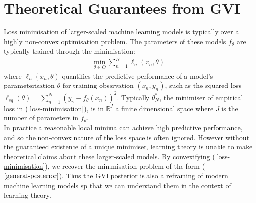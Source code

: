 \documentclass[twoside,11pt]{article}
\newcommand{\jk}[1]{{\color{blue} [JK: #1]}}
\begin{document}
\section{Theoretical Guarantees from GVI \cite{wild2023rigorous}}
Loss minimisation of larger-scaled machine learning models is typically over a highly non-convex optimisation problem. The parameters of these models $f_{\theta}$ are typically trained through the minimisation:
\begin{align}
\min_{\theta \in \Theta} \sum_{n=1}^N\ell_n(x_n, \theta)
\label{loss-minimisation}
\end{align}
where $\ell_n(x_n, \theta)$ quantifies the predictive performance of a model's parameterisation $\theta$ for training observation $(x_n, y_n)$, such as the squared loss $\ell_{sq}(\theta) = \sum_{n=1}^N \left(y_n - f_{\theta}(x_n)\right)^2$. Typically $\theta_N^*$, the minimiser of empirical loss in (\ref{loss-minimisation}), is in $ \mathbb{R}^J$ a finite dimensional space where $J$ is the number of parameters in $f_{\theta}$.\\
\newline
In practice a reasonable local minima can achieve high predictive performance, and so the non-convex nature of the loss space is often ignored.
%
%
However without the guaranteed existence of a unique minimiser, learning theory is unable to make theoretical claims about these larger-scaled models. By convexifying (\ref{loss-minimisation}), we recover the minimisation problem of the form ($\ref{general-posterior}$). Thus the GVI posterior is also a reframing of modern machine learning models sp that we can understand them in the context of learning theory.
\end{document}
